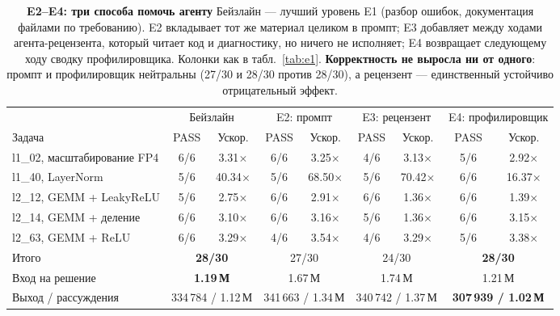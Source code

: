 \documentclass[10pt,a4paper]{article}
\begin{document}
\begin{table}[h]
\centering\footnotesize
\caption{\textbf{E2--E4: три способа помочь агенту} Бейзлайн ---
лучший уровень E1 (разбор ошибок, документация файлами по требованию). E2 вкладывает тот же
материал целиком в промпт; E3 добавляет между ходами агента-рецензента, который читает код и
диагностику, но ничего не исполняет; E4 возвращает следующему ходу сводку профилировщика.
Колонки как в табл.~\ref{tab:e1}. \textbf{Корректность не выросла ни от одного}: промпт и
профилировщик нейтральны (27/30 и 28/30 против 28/30), а рецензент --- единственный устойчиво
отрицательный эффект.}
\label{tab:abl}
\begin{tabular}{l cc cc cc cc}
\toprule
& \multicolumn{2}{c}{Бейзлайн} & \multicolumn{2}{c}{E2: промпт}
& \multicolumn{2}{c}{E3: рецензент} & \multicolumn{2}{c}{E4: профилировщик} \\
\cmidrule(lr){2-3}\cmidrule(lr){4-5}\cmidrule(lr){6-7}\cmidrule(lr){8-9}
Задача & PASS & Ускор. & PASS & Ускор. & PASS & Ускор. & PASS & Ускор. \\
\midrule
l1\_02, масштабирование FP4 & 6/6 & 3.31$\times$  & 6/6 & 3.25$\times$  & 4/6 & 3.13$\times$  & 5/6 & 2.92$\times$ \\
l1\_40, LayerNorm           & 5/6 & 40.34$\times$ & 5/6 & 68.50$\times$ & 5/6 & 70.42$\times$ & 6/6 & 16.37$\times$ \\
l2\_12, GEMM + LeakyReLU    & 5/6 & 2.75$\times$  & 6/6 & 2.91$\times$  & 6/6 & 1.36$\times$  & 6/6 & 1.39$\times$ \\
l2\_14, GEMM + деление      & 6/6 & 3.10$\times$  & 6/6 & 3.16$\times$  & 5/6 & 1.36$\times$  & 6/6 & 3.15$\times$ \\
l2\_63, GEMM + ReLU         & 6/6 & 3.29$\times$  & 4/6 & 3.54$\times$  & 4/6 & 3.29$\times$  & 5/6 & 3.38$\times$ \\
\midrule
Итого & \multicolumn{2}{c}{\textbf{28/30}} & \multicolumn{2}{c}{27/30}
      & \multicolumn{2}{c}{24/30} & \multicolumn{2}{c}{\textbf{28/30}} \\
Вход на решение & \multicolumn{2}{c}{\textbf{1.19\,М}} & \multicolumn{2}{c}{1.67\,М}
      & \multicolumn{2}{c}{1.74\,М} & \multicolumn{2}{c}{1.21\,М} \\
Выход / рассуждения & \multicolumn{2}{c}{334\,784 / 1.12\,М} & \multicolumn{2}{c}{341\,663 / 1.34\,М}
      & \multicolumn{2}{c}{340\,742 / 1.37\,М} & \multicolumn{2}{c}{\textbf{307\,939 / 1.02\,М}} \\
\bottomrule
\end{tabular}
\end{table}
\end{document}
